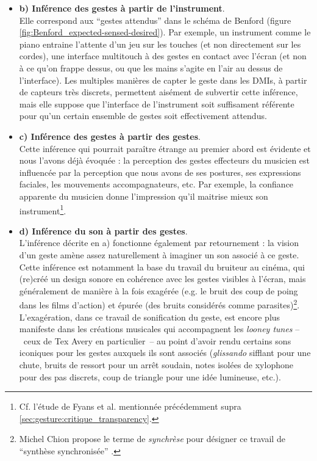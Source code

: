 \begin{itemize}[noitemsep]
	\item \textbf{b) Inférence des gestes à partir de l'instrument}.\\
	Elle correspond aux ``gestes attendus'' dans le schéma de Benford (figure \ref{fig:Benford_expected-sensed-desired}). Par exemple, un instrument comme le piano entraine l'attente d'un jeu sur les touches (et non directement sur les cordes), une interface multitouch à des gestes en contact avec l'écran (et non à ce qu'on frappe dessus, ou que les mains s'agite en l'air au dessus de l'interface). Les multiples manières de capter le geste dans les \glspl{DMI}, à partir de capteurs très discrets, permettent aisément de subvertir cette inférence, mais elle suppose que l'interface de l'instrument soit suffisament référente pour qu'un certain ensemble de gestes soit effectivement attendus.

	\item \textbf{c) Inférence des gestes à partir des gestes}.\\
	Cette inférence qui pourrait paraître étrange au premier abord est évidente et nous l'avons déjà évoquée : la perception des gestes effecteurs du musicien est influencée par la perception que nous avons de ses postures, ses expressions faciales, les mouvements accompagnateurs, etc. Par exemple, la confiance apparente du musicien donne l'impression qu'il maitrise mieux son instrument\footnote{Cf. l'étude de Fyans et al. mentionnée précédemment supra \ref{sec:gesture:critique_transparency}.}.

	\item \textbf{d) Inférence du son à partir des gestes}.\\
	L'inférence décrite en a) fonctionne également par retournement : la vision d'un geste amène assez naturellement à imaginer un son associé à ce geste. Cette inférence est notamment la base du travail du bruiteur au cinéma, qui (re)créé un design sonore en cohérence avec les gestes visibles à l'écran, mais généralement de manière à la fois exagérée (e.g. le bruit des coup de poing dans les films d'action) et épurée (des bruits considérés comme parasites)\footnote{Michel Chion propose le terme de \textit{synchrèse} pour désigner ce travail de ``synthèse synchronisée'' \cite{chion_audio-vision:_2013}.}. L'exagération, dans ce travail de sonification du geste, est encore plus manifeste dans les créations musicales qui accompagnent les \textit{looney tunes} --~ceux de Tex Avery en particulier~-- au point d'avoir rendu certains sons iconiques pour les gestes auxquels ils sont associés (\textit{glissando} sifflant pour une chute, bruits de ressort pour un arrêt soudain, notes isolées de xylophone pour des pas discrets, coup de triangle pour une idée lumineuse, etc.).


\end{itemize}
